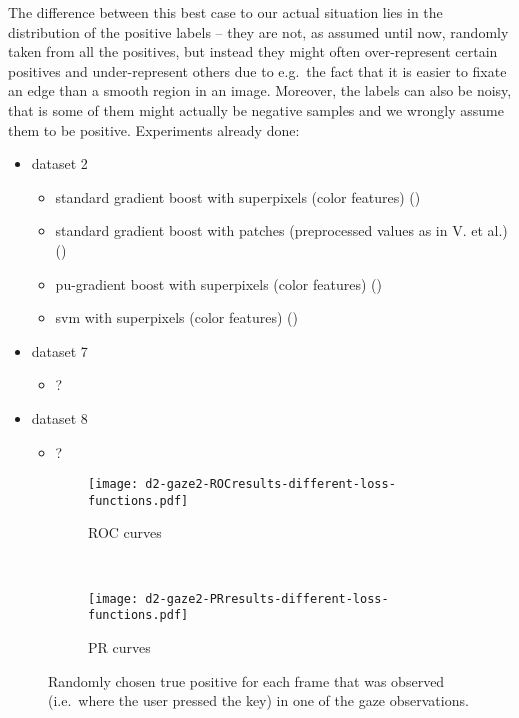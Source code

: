 The difference between this best case to our actual situation lies in the distribution of the positive labels -- they are not, as assumed until now, randomly taken from all the positives, but instead they might often over-represent certain positives and under-represent others due to e.g.\ the fact that it is easier to fixate an edge than a smooth region in an image. 
Moreover, the labels can also be noisy, that is some of them might actually be negative samples and we wrongly assume them to be positive. Experiments already done:
\begin{itemize}
\item dataset 2
  \begin{itemize}
  \item standard gradient boost with superpixels (color features) ()
  \item standard gradient boost with patches (preprocessed values as in V. et al.) ()
  \item pu-gradient boost with superpixels (color features) ()
  \item svm with superpixels (color features) ()
  \end{itemize}
\item dataset 7
  \begin{itemize}
  \item ?
  \end{itemize}
\item dataset 8
  \begin{itemize}
  \item ?
  \end{itemize}


\end{itemize}


\begin{figure}[ht]
	\centering
	\begin{subfigure}[h]{0.45\textwidth}
	\texttt{[image: d2-gaze2-ROCresults-different-loss-functions.pdf]}	
		\caption*{ROC curves}
	\end{subfigure}
	~
	\begin{subfigure}[h]{0.45\textwidth}
	\texttt{[image: d2-gaze2-PRresults-different-loss-functions.pdf]}	
		\caption*{PR curves}
	\end{subfigure}
	\caption{Randomly chosen true positive for each frame that was observed (i.e.\ where the user pressed the key) in one of the gaze observations.}
	\label{fig:one-random-tp-per-frame}
\end{figure}




